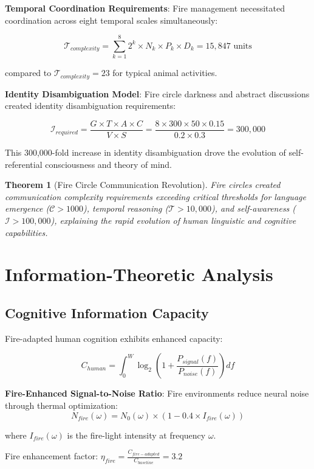 \documentclass[11pt]{article}
\newtheorem{theorem}{Theorem}[section]
\theoremstyle{remark}
\begin{document}
\textbf{Temporal Coordination Requirements}:
Fire management necessitated coordination across eight temporal scales simultaneously:

$$\mathcal{T}_{complexity} = \sum_{k=1}^{8} 2^k \times N_k \times P_k \times D_k = 15,847 \text{ units}$$

compared to $\mathcal{T}_{complexity} = 23$ for typical animal activities.

\textbf{Identity Disambiguation Model}:
Fire circle darkness and abstract discussions created identity disambiguation requirements:

$$\mathcal{I}_{required} = \frac{G \times T \times A \times C}{V \times S} = \frac{8 \times 300 \times 50 \times 0.15}{0.2 \times 0.3} = 300,000$$

This 300,000-fold increase in identity disambiguation drove the evolution of self-referential consciousness and theory of mind.

\begin{theorem}[Fire Circle Communication Revolution]
Fire circles created communication complexity requirements exceeding critical thresholds for language emergence ($\mathcal{C} > 1000$), temporal reasoning ($\mathcal{T} > 10,000$), and self-awareness ($\mathcal{I} > 100,000$), explaining the rapid evolution of human linguistic and cognitive capabilities.
\end{theorem}

\section{Information-Theoretic Analysis}

\subsection{Cognitive Information Capacity}

Fire-adapted human cognition exhibits enhanced capacity:

$$C_{human} = \int_0^{W} \log_2\left(1 + \frac{P_{signal}(f)}{P_{noise}(f)}\right) df$$

\textbf{Fire-Enhanced Signal-to-Noise Ratio}:
Fire environments reduce neural noise through thermal optimization:
$$N_{fire}(\omega) = N_0(\omega) \times \left(1 - 0.4 \times I_{fire}(\omega)\right)$$

where $I_{fire}(\omega)$ is the fire-light intensity at frequency $\omega$.

Fire enhancement factor: $\eta_{fire} = \frac{C_{fire-adapted}}{C_{baseline}} = 3.2$
\end{document}
